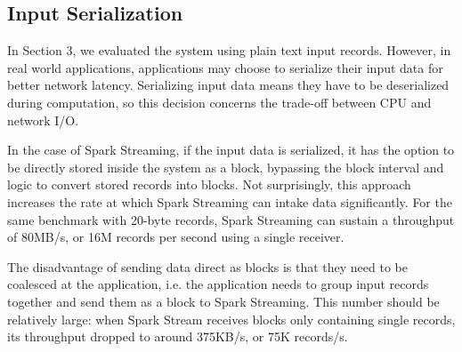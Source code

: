 \subsection{Input Serialization}
In Section 3, we evaluated the system using plain text input records. However, in real world applications, applications may choose to serialize their input data for better network latency. Serializing input data means they have to be deserialized during computation, so this decision concerns the trade-off between CPU and network I/O.

In the case of Spark Streaming, if the input data is serialized, it has the option to be directly stored inside the system as a block, bypassing the block interval and logic to convert stored records into blocks. Not surprisingly, this approach increases the rate at which Spark Streaming can intake data significantly. For the same benchmark with 20-byte records, Spark Streaming can sustain a throughput of 80MB/s, or 16M records per second using a single receiver.

The disadvantage of sending data direct as blocks is that they need to be coalesced at the application, i.e. the application needs to group input records together and send them as a block to Spark Streaming. This number should be relatively large: when Spark Stream receives blocks only containing single records, its throughput dropped to around 375KB/s, or 75K records/s.



